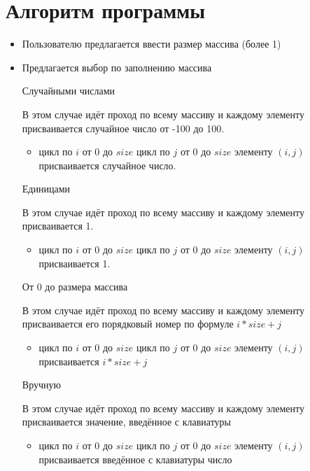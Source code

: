 \documentclass[12pt,a4paper]{article}%
\begin{document}
	\section*{Алгоритм программы}
	
	\begin{itemize}
		\item Пользователю предлагается ввести размер массива (более 1)
		
		\item Предлагается выбор по заполнению массива
		
		\subitem Случайными числами
		
		В этом случае идёт проход по всему массиву и каждому элементу присваивается случайное число от -100 до 100.
		
		\begin{itemize}
			\item цикл по $i$ от 0 до $size$
			\subitem цикл по $j$ от 0 до $size$
			\subsubitem элементу $ (i,j) $ присваивается случайное число.
		\end{itemize}
		
		\subitem Единицами
		
		В этом случае идёт проход по всему массиву и каждому элементу присваивается 1.
		
		\begin{itemize}
			\item цикл по $i$ от 0 до $size$
			\subitem цикл по $j$ от 0 до $size$
			\subsubitem элементу $ (i,j) $ присваивается 1.
		\end{itemize}
		
		\subitem От 0 до размера массива
		
		В этом случае идёт проход по всему массиву и каждому элементу присваивается его порядковый номер по формуле $ i*size+j $
		
		\begin{itemize}
			\item цикл по $i$ от 0 до $size$
			\subitem цикл по $j$ от 0 до $size$
			\subsubitem элементу $ (i,j) $ присваивается $ i*size+j $
		\end{itemize}
		
		\subitem Вручную
		
		В этом случае идёт проход по всему массиву и каждому элементу присваивается значение, введённое с клавиатуры
		
		\begin{itemize}
			\item цикл по $i$ от 0 до $size$
			\subitem цикл по $j$ от 0 до $size$
			\subsubitem элементу $ (i,j) $ присваивается введённое с клавиатуры число
		\end{itemize}
		

\end{itemize}
\end{document}
